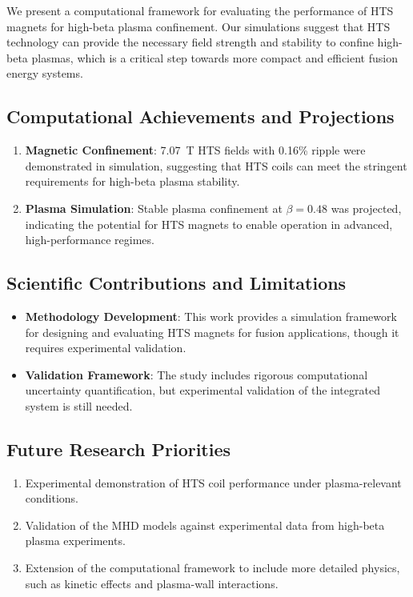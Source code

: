 \documentclass[12pt,a4paper]{article}
\begin{document}
We present a computational framework for evaluating the performance of HTS magnets for high-beta plasma confinement. Our simulations suggest that HTS technology can provide the necessary field strength and stability to confine high-beta plasmas, which is a critical step towards more compact and efficient fusion energy systems.

\subsection{Computational Achievements and Projections}
\begin{enumerate}
\item \textbf{Magnetic Confinement}: 7.07~T HTS fields with 0.16\% ripple were demonstrated in simulation, suggesting that HTS coils can meet the stringent requirements for high-beta plasma stability.
\item \textbf{Plasma Simulation}: Stable plasma confinement at $\beta=0.48$ was projected, indicating the potential for HTS magnets to enable operation in advanced, high-performance regimes.
\end{enumerate}

\subsection{Scientific Contributions and Limitations}
\begin{itemize}
\item \textbf{Methodology Development}: This work provides a simulation framework for designing and evaluating HTS magnets for fusion applications, though it requires experimental validation.
\item \textbf{Validation Framework}: The study includes rigorous computational uncertainty quantification, but experimental validation of the integrated system is still needed.
\end{itemize}

\subsection{Future Research Priorities}
\begin{enumerate}
\item Experimental demonstration of HTS coil performance under plasma-relevant conditions.
\item Validation of the MHD models against experimental data from high-beta plasma experiments.
\item Extension of the computational framework to include more detailed physics, such as kinetic effects and plasma-wall interactions.
\end{enumerate}
\end{document}
